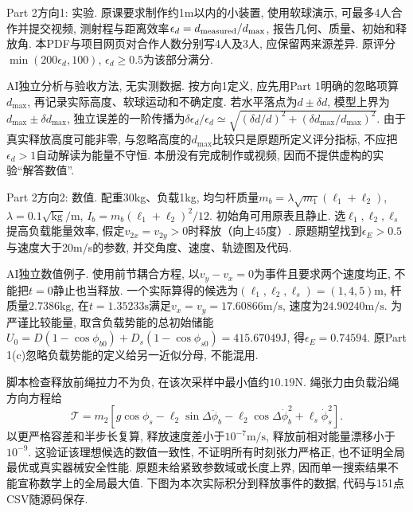 \begin{exercise}
Part 2方向1: 实验. 原课要求制作约1m以内的小装置, 使用软球演示, 可最多4人合作并提交视频, 测射程与距离效率$\epsilon_d=d_{\rm measured}/d_{\max}$, 报告几何、质量、初始和释放角. 本PDF与项目网页对合作人数分别写4人及3人, 应保留两来源差异. 原评分$\min(200\epsilon_d,100)$, $\epsilon_d\ge0.5$为该部分满分.
\end{exercise}
\begin{solution}
AI独立分析与验收方法, 无实测数据. 按方向1定义, 应先用Part 1明确的忽略项算$d_{\max}$, 再记录实际高度、软球运动和不确定度. 若水平落点为$d\pm\delta d$, 模型上界为$d_{\max}\pm\delta d_{\max}$, 独立误差的一阶传播为$\delta\epsilon_d/\epsilon_d\simeq\sqrt{(\delta d/d)^2+(\delta d_{\max}/d_{\max})^2}$. 由于真实释放高度可能非零, 与忽略高度的$d_{\max}$比较只是原题所定义评分指标, 不应把$\epsilon_d>1$自动解读为能量不守恒. 本册没有完成制作或视频, 因而不提供虚构的实验“解答数值”.
\end{solution}

\begin{exercise}
Part 2方向2: 数值. 配重30kg、负载1kg, 均匀杆质量$m_b=\lambda\sqrt{m_1}(\ell_1+\ell_2)$, $\lambda=0.1\sqrt{\mathrm{kg}}/\mathrm m$, $I_b=m_b(\ell_1+\ell_2)^2/12$. 初始角可用原表且静止. 选$\ell_1,\ell_2,\ell_s$提高负载能量效率, 假定$v_{2x}=v_{2y}>0$时释放（向上45度）. 原题期望找到$\epsilon_E>0.5$与速度大于20m/s的参数, 并交角度、速度、轨迹图及代码.
\end{exercise}
\begin{solution}
AI独立数值例子. 使用前节耦合方程, 以$v_y-v_x=0$为事件且要求两个速度均正, 不能把$t=0$静止也当释放. 一个实际算得的候选为$(\ell_1,\ell_2,\ell_s)=(1,4,5)\mathrm m$, 杆质量$2.7386\mathrm{kg}$, 在$t=1.35233\mathrm s$满足$v_x=v_y=17.60866\mathrm{m/s}$, 速度为$24.90240\mathrm{m/s}$. 为严谨比较能量, 取含负载势能的总初始储能$U_0=D(1-\cos\phi_{b0})+D_s(1-\cos\phi_{s0})=415.67049\mathrm J$, 得$\epsilon_E=0.74594$. 原Part 1(c)忽略负载势能的定义给另一近似分母, 不能混用.

脚本检查释放前绳拉力不为负, 在该次采样中最小值约$10.19\mathrm N$. 绳张力由负载沿绳方向方程给
\[
\mathcal T=m_2\left[g\cos\phi_s-\ell_2\sin\Delta\ddot\phi_b
-\ell_2\cos\Delta\dot\phi_b^2+\ell_s\dot\phi_s^2\right].
\]
以更严格容差和半步长复算, 释放速度差小于$10^{-7}\mathrm{m/s}$, 释放前相对能量漂移小于$10^{-9}$. 这验证该理想候选的数值一致性, 不证明所有时刻张力严格正, 也不证明全局最优或真实器械安全性能. 原题未给紧致参数域或长度上界, 因而单一搜索结果不能宣称数学上的全局最大值. 下图为本次实际积分到释放事件的数据, 代码与151点CSV随源码保存.
\end{solution}


